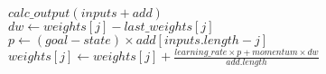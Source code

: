 \State $calc\_output(inputs + add)$
\\
\State $dw \gets weights[j] - last\_weights[j]$
\State $p \gets (goal - state ) \times add[inputs.length - j]$
\State $weights[j] \gets weights[j] + \frac{learning\_rate \times p + momentum \times dw}{add.length} $
\EndFor
\EndFunction
